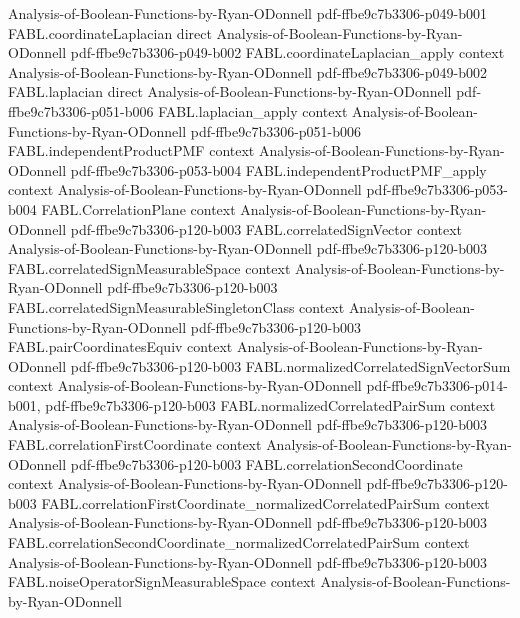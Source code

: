 \begin{theorem}
  {Analysis-of-Boolean-Functions-by-Ryan-ODonnell}
  {pdf-ffbe9c7b3306-p049-b001}
\proofstep
  {FABL.coordinateLaplacian}
  {direct}
  {Analysis-of-Boolean-Functions-by-Ryan-ODonnell}
  {pdf-ffbe9c7b3306-p049-b002}
\proofstep
  {FABL.coordinateLaplacian_apply}
  {context}
  {Analysis-of-Boolean-Functions-by-Ryan-ODonnell}
  {pdf-ffbe9c7b3306-p049-b002}
\proofstep
  {FABL.laplacian}
  {direct}
  {Analysis-of-Boolean-Functions-by-Ryan-ODonnell}
  {pdf-ffbe9c7b3306-p051-b006}
\proofstep
  {FABL.laplacian_apply}
  {context}
  {Analysis-of-Boolean-Functions-by-Ryan-ODonnell}
  {pdf-ffbe9c7b3306-p051-b006}
\proofstep
  {FABL.independentProductPMF}
  {context}
  {Analysis-of-Boolean-Functions-by-Ryan-ODonnell}
  {pdf-ffbe9c7b3306-p053-b004}
\proofstep
  {FABL.independentProductPMF_apply}
  {context}
  {Analysis-of-Boolean-Functions-by-Ryan-ODonnell}
  {pdf-ffbe9c7b3306-p053-b004}
\proofstep
  {FABL.CorrelationPlane}
  {context}
  {Analysis-of-Boolean-Functions-by-Ryan-ODonnell}
  {pdf-ffbe9c7b3306-p120-b003}
\proofstep
  {FABL.correlatedSignVector}
  {context}
  {Analysis-of-Boolean-Functions-by-Ryan-ODonnell}
  {pdf-ffbe9c7b3306-p120-b003}
\proofstep
  {FABL.correlatedSignMeasurableSpace}
  {context}
  {Analysis-of-Boolean-Functions-by-Ryan-ODonnell}
  {pdf-ffbe9c7b3306-p120-b003}
\proofstep
  {FABL.correlatedSignMeasurableSingletonClass}
  {context}
  {Analysis-of-Boolean-Functions-by-Ryan-ODonnell}
  {pdf-ffbe9c7b3306-p120-b003}
\proofstep
  {FABL.pairCoordinatesEquiv}
  {context}
  {Analysis-of-Boolean-Functions-by-Ryan-ODonnell}
  {pdf-ffbe9c7b3306-p120-b003}
\proofstep
  {FABL.normalizedCorrelatedSignVectorSum}
  {context}
  {Analysis-of-Boolean-Functions-by-Ryan-ODonnell}
  {pdf-ffbe9c7b3306-p014-b001,
    pdf-ffbe9c7b3306-p120-b003}
\proofstep
  {FABL.normalizedCorrelatedPairSum}
  {context}
  {Analysis-of-Boolean-Functions-by-Ryan-ODonnell}
  {pdf-ffbe9c7b3306-p120-b003}
\proofstep
  {FABL.correlationFirstCoordinate}
  {context}
  {Analysis-of-Boolean-Functions-by-Ryan-ODonnell}
  {pdf-ffbe9c7b3306-p120-b003}
\proofstep
  {FABL.correlationSecondCoordinate}
  {context}
  {Analysis-of-Boolean-Functions-by-Ryan-ODonnell}
  {pdf-ffbe9c7b3306-p120-b003}
\proofstep
  {FABL.correlationFirstCoordinate_normalizedCorrelatedPairSum}
  {context}
  {Analysis-of-Boolean-Functions-by-Ryan-ODonnell}
  {pdf-ffbe9c7b3306-p120-b003}
\proofstep
  {FABL.correlationSecondCoordinate_normalizedCorrelatedPairSum}
  {context}
  {Analysis-of-Boolean-Functions-by-Ryan-ODonnell}
  {pdf-ffbe9c7b3306-p120-b003}
\proofstep
  {FABL.noiseOperatorSignMeasurableSpace}
  {context}
  {Analysis-of-Boolean-Functions-by-Ryan-ODonnell}

\end{theorem}
